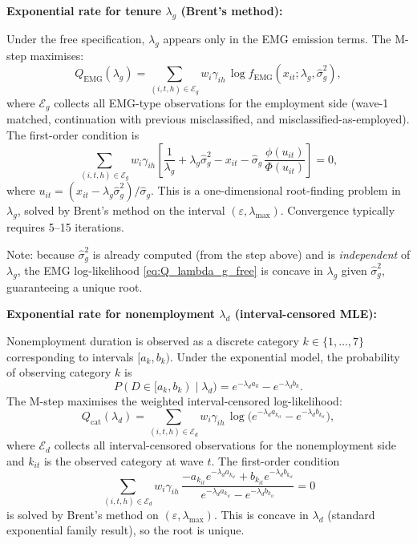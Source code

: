 \documentclass[12pt]{article}
\begin{document}
\textbf{Exponential rate for tenure \(\lambda_g\) (Brent's method):}

Under the free specification, \(\lambda_g\) appears only in the EMG emission terms. The M-step maximises:
\begin{equation}
Q_{\mathrm{EMG}}(\lambda_g) = \sum_{(i,t,h)\in\mathcal{E}_g} w_i\gamma_{ih}\,\log f_{\mathrm{EMG}}(x_{it};\lambda_g,\hat{\sigma}_g^2),
\label{eq:Q_lambda_g_free}
\end{equation}
where \(\mathcal{E}_g\) collects all EMG-type observations for the employment side (wave-1 matched, continuation with previous misclassified, and misclassified-as-employed). The first-order condition is
\begin{equation}
\sum_{(i,t,h)\in\mathcal{E}_g} w_i\gamma_{ih}\left[\frac{1}{\lambda_g} + \lambda_g\hat{\sigma}_g^2 - x_{it} - \hat{\sigma}_g\,\frac{\phi(u_{it})}{\Phi(u_{it})}\right] = 0,
\label{eq:foc_lambda_g}
\end{equation}
where \(u_{it} = (x_{it} - \lambda_g\hat{\sigma}_g^2)/\hat{\sigma}_g\). This is a one-dimensional root-finding problem in \(\lambda_g\), solved by Brent's method on the interval \((\varepsilon, \lambda_{\max})\). Convergence typically requires 5--15 iterations.

Note: because \(\hat{\sigma}_g^2\) is already computed (from the step above) and is \emph{independent} of \(\lambda_g\), the EMG log-likelihood \eqref{eq:Q_lambda_g_free} is concave in \(\lambda_g\) given \(\hat{\sigma}_g^2\), guaranteeing a unique root.

\textbf{Exponential rate for nonemployment \(\lambda_d\) (interval-censored MLE):}

Nonemployment duration is observed as a discrete category \(k\in\{1,\dots,7\}\) corresponding to intervals \([a_k, b_k)\). Under the exponential model, the probability of observing category \(k\) is
\[
P(D\in[a_k,b_k)\mid\lambda_d) = e^{-\lambda_d a_k} - e^{-\lambda_d b_k}.
\]
The M-step maximises the weighted interval-censored log-likelihood:
\begin{equation}
Q_{\mathrm{cat}}(\lambda_d) = \sum_{(i,t,h)\in\mathcal{E}_d} w_i\gamma_{ih}\,\log\!\big(e^{-\lambda_d a_{k_{it}}} - e^{-\lambda_d b_{k_{it}}}\big),
\label{eq:Q_lambda_d_free}
\end{equation}
where \(\mathcal{E}_d\) collects all interval-censored observations for the nonemployment side and \(k_{it}\) is the observed category at wave \(t\). The first-order condition
\begin{equation}
\sum_{(i,t,h)\in\mathcal{E}_d} w_i\gamma_{ih}\,\frac{-a_{k_{it}} e^{-\lambda_d a_{k_{it}}} + b_{k_{it}} e^{-\lambda_d b_{k_{it}}}}{e^{-\lambda_d a_{k_{it}}} - e^{-\lambda_d b_{k_{it}}}} = 0
\label{eq:foc_lambda_d}
\end{equation}
is solved by Brent's method on \((\varepsilon, \lambda_{\max})\). This is concave in \(\lambda_d\) (standard exponential family result), so the root is unique.
\end{document}

